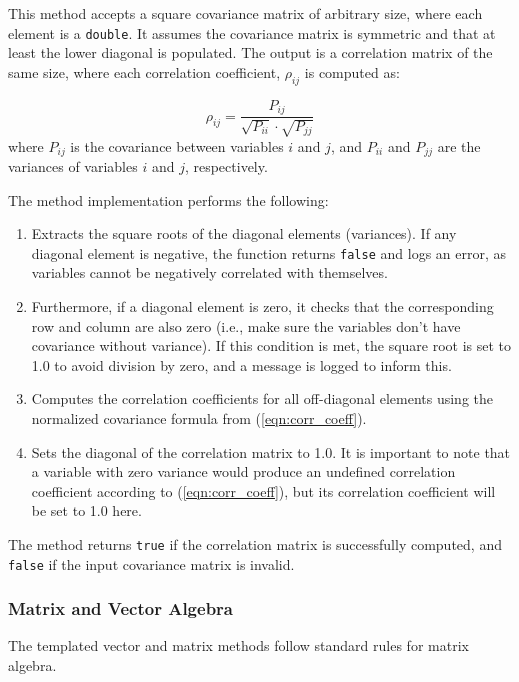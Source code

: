 \documentclass[11pt,fleqn]{report}
\begin{document}
This method accepts a square covariance matrix of arbitrary size, where each 
element is a \texttt{double}. It assumes the covariance matrix is symmetric and 
that at least the lower diagonal is populated. The output is a correlation matrix
of the same size, where each correlation coefficient, $\rho_{ij}$ is computed as:

\begin{equation}
\rho_{ij} = \frac{P_{ij}}{\sqrt{P_{ii}} \cdot \sqrt{P_{jj}}}
\label{eqn:corr_coeff}
\end{equation}
where $P_{ij}$ is the covariance between variables $i$ and $j$, and 
$P_{ii}$ and $P_{jj}$ are the variances of variables $i$ and $j$, respectively.

The method implementation performs the following:
\begin{enumerate}
\item Extracts the square roots of the diagonal elements (variances). If 
any diagonal element is negative, the function returns \texttt{false} 
and logs an error, as variables cannot be negatively correlated with
themselves. 
\item Furthermore, if a diagonal element is zero, it checks that the corresponding 
row and column are also zero (i.e., make sure the variables don't have 
covariance without variance). 
If this condition is met, the square root is set to 1.0 to avoid 
division by zero, and a message is logged to inform this.
\item Computes the correlation coefficients for all off-diagonal elements 
using the normalized covariance formula from (\ref{eqn:corr_coeff}).
\item Sets the diagonal of the correlation matrix to 1.0. It is important to
note that a variable with zero variance would produce an
undefined correlation coefficient according to (\ref{eqn:corr_coeff}), 
but its correlation coefficient will be set to 1.0 here.
\end{enumerate}

The method returns \texttt{true} if the correlation matrix is successfully 
computed, and \texttt{false} if the input covariance matrix is invalid.

\subsubsection {Matrix and Vector Algebra}
The templated vector and matrix methods follow standard rules for matrix
algebra.
\end{document}
